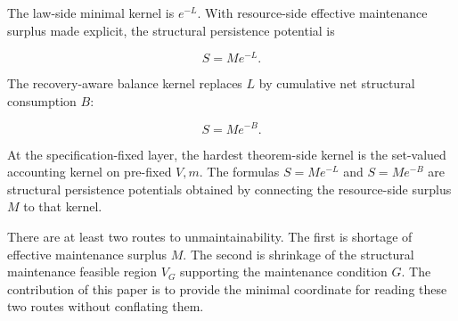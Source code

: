 \documentclass[12pt,a4paper]{article}
\begin{document}
The law-side minimal kernel is \(e^{-L}\). With resource-side effective maintenance surplus made explicit, the structural persistence potential is

\[
S=Me^{-L}.
\]

The recovery-aware balance kernel replaces \(L\) by cumulative net structural consumption \(B\):

\[
S=Me^{-B}.
\]

At the specification-fixed layer, the hardest theorem-side kernel is the set-valued accounting kernel on pre-fixed \(V,m\). The formulas \(S=Me^{-L}\) and \(S=Me^{-B}\) are structural persistence potentials obtained by connecting the resource-side surplus \(M\) to that kernel.

There are at least two routes to unmaintainability. The first is shortage of effective maintenance surplus \(M\). The second is shrinkage of the structural maintenance feasible region \(V_{G}\) supporting the maintenance condition \(G\). The contribution of this paper is to provide the minimal coordinate for reading these two routes without conflating them.
\end{document}
